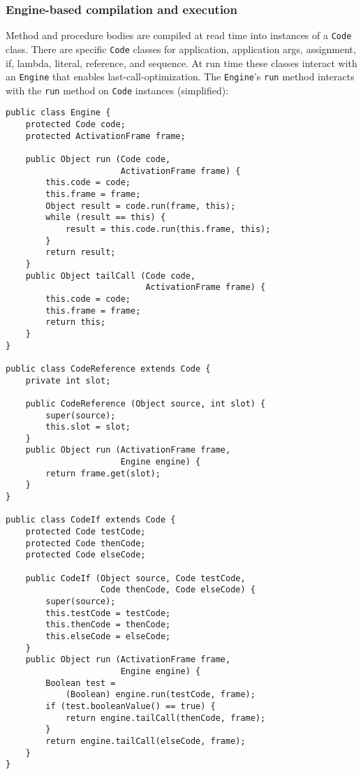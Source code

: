 \documentclass{acm-final/sig-alternate-modified}
\begin{document}
\subsubsection{Engine-based compilation and execution}

Method and procedure bodies are compiled at read time into instances
of a {\tt Code} class.  There are specific {\tt Code} classes for
application, application args, assignment, if, lambda, literal,
reference, and sequence.  At run time these classes interact with an
{\tt Engine} that enables last-call-optimization.  The {\tt Engine}'s
{\tt run} method interacts with the {\tt run} method on {\tt Code}
instances (simplified):

\small
\begin{verbatim}
public class Engine {
    protected Code code;
    protected ActivationFrame frame;

    public Object run (Code code,
                       ActivationFrame frame) {
        this.code = code;
        this.frame = frame;
        Object result = code.run(frame, this);
        while (result == this) {
            result = this.code.run(this.frame, this);
        }
        return result;
    }
    public Object tailCall (Code code,
                            ActivationFrame frame) {
        this.code = code;
        this.frame = frame;
        return this;
    }
}

public class CodeReference extends Code {
    private int slot;

    public CodeReference (Object source, int slot) {
        super(source);
        this.slot = slot;
    }
    public Object run (ActivationFrame frame,
                       Engine engine) {
        return frame.get(slot);
    }
}

public class CodeIf extends Code {
    protected Code testCode;
    protected Code thenCode;
    protected Code elseCode;

    public CodeIf (Object source, Code testCode,
                   Code thenCode, Code elseCode) {
        super(source);
        this.testCode = testCode;
        this.thenCode = thenCode;
        this.elseCode = elseCode;
    }
    public Object run (ActivationFrame frame,
                       Engine engine) {
        Boolean test = 
            (Boolean) engine.run(testCode, frame);
        if (test.booleanValue() == true) {
            return engine.tailCall(thenCode, frame);
        }
        return engine.tailCall(elseCode, frame);
    }
}
\end{verbatim}
\normalsize
\end{document}
